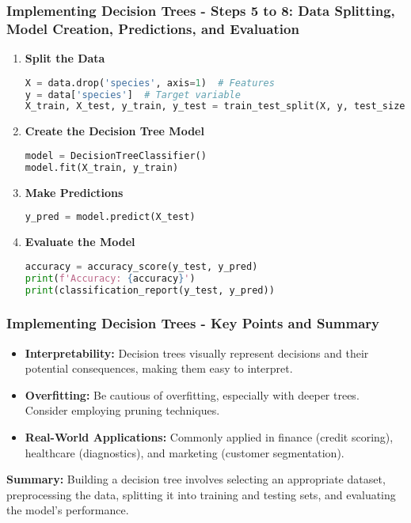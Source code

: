 \documentclass[aspectratio=169]{beamer}
\begin{document}
\begin{frame}[fragile]
    \frametitle{Implementing Decision Trees - Steps 5 to 8: Data Splitting, Model Creation, Predictions, and Evaluation}
    \begin{enumerate}
        \item \textbf{Split the Data}
        \begin{lstlisting}[language=Python]
X = data.drop('species', axis=1)  # Features
y = data['species']  # Target variable
X_train, X_test, y_train, y_test = train_test_split(X, y, test_size=0.3, random_state=42)  # 70\% train, 30\% test
        \end{lstlisting}

        \item \textbf{Create the Decision Tree Model}
        \begin{lstlisting}[language=Python]
model = DecisionTreeClassifier()
model.fit(X_train, y_train)
        \end{lstlisting}

        \item \textbf{Make Predictions}
        \begin{lstlisting}[language=Python]
y_pred = model.predict(X_test)
        \end{lstlisting}

        \item \textbf{Evaluate the Model}
        \begin{lstlisting}[language=Python]
accuracy = accuracy_score(y_test, y_pred)
print(f'Accuracy: {accuracy}')
print(classification_report(y_test, y_pred))
        \end{lstlisting}
    \end{enumerate}
\end{frame}

\begin{frame}
    \frametitle{Implementing Decision Trees - Key Points and Summary}
    \begin{itemize}
        \item \textbf{Interpretability:} 
        Decision trees visually represent decisions and their potential consequences, making them easy to interpret.
        
        \item \textbf{Overfitting:} 
        Be cautious of overfitting, especially with deeper trees. Consider employing pruning techniques.
        
        \item \textbf{Real-World Applications:} 
        Commonly applied in finance (credit scoring), healthcare (diagnostics), and marketing (customer segmentation).
    \end{itemize}

    \textbf{Summary:} Building a decision tree involves selecting an appropriate dataset, preprocessing the data, splitting it into training and testing sets, and evaluating the model's performance.
\end{frame}
\end{document}
